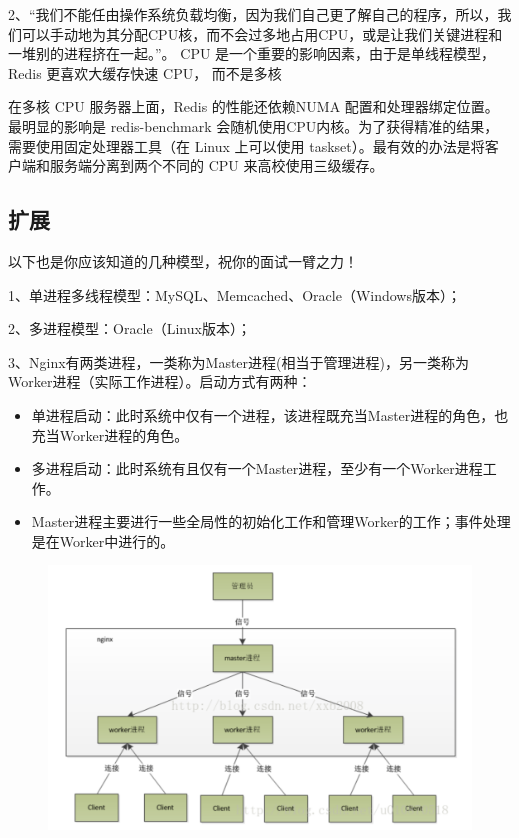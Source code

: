\documentclass[12pt]{article}
\begin{document}
2、“我们不能任由操作系统负载均衡，因为我们自己更了解自己的程序，所以，我们可以手动地为其分配CPU核，而不会过多地占用CPU，或是让我们关键进程和一堆别的进程挤在一起。”。
CPU 是一个重要的影响因素，由于是单线程模型，Redis 更喜欢大缓存快速 CPU， 而不是多核

在多核 CPU 服务器上面，Redis 的性能还依赖NUMA 配置和处理器绑定位置。最明显的影响是 redis-benchmark 会随机使用CPU内核。为了获得精准的结果，需要使用固定处理器工具（在 Linux 上可以使用 taskset）。最有效的办法是将客户端和服务端分离到两个不同的 CPU 来高校使用三级缓存。

\subsection{扩展}
以下也是你应该知道的几种模型，祝你的面试一臂之力！

1、单进程多线程模型：MySQL、Memcached、Oracle（Windows版本）；

2、多进程模型：Oracle（Linux版本）；

3、Nginx有两类进程，一类称为Master进程(相当于管理进程)，另一类称为Worker进程（实际工作进程）。启动方式有两种：
\begin{itemize}
\setlength{\itemsep}{0pt}
\setlength{\parsep}{0pt}
\setlength{\parskip}{0pt}
    \item 单进程启动：此时系统中仅有一个进程，该进程既充当Master进程的角色，也充当Worker进程的角色。
    \item 多进程启动：此时系统有且仅有一个Master进程，至少有一个Worker进程工作。
    \item Master进程主要进行一些全局性的初始化工作和管理Worker的工作；事件处理是在Worker中进行的。
\end{itemize}
\begin{figure}[H]
    \centering
    \includegraphics[width=1\textwidth]{fig/Redis_Fast_7.png}
\end{figure}





\end{document}
